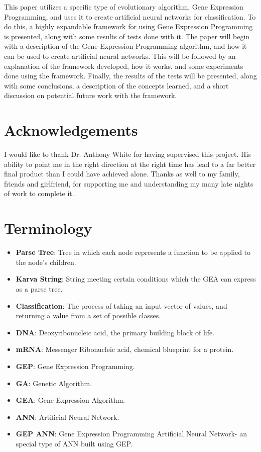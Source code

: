 \documentclass[a4paper,11pt]{report}
\begin{document}
This paper utilizes a specific type of evolutionary algorithm, Gene Expression Programming,
and uses it to create artificial neural networks for classification. To do this, a highly expandable 
framework for using Gene Expression Programming is presented, along with some results of tests done 
with it. The paper will begin with a description of the Gene Expression Programming algorithm, and 
how it can be used to create artificial neural networks. This will be followed by an explanation 
of the framework developed, how it works, and some experiments done using the framework. Finally,
the results of the tests will be presented, along with some conclusions, a description of the 
concepts learned, and a short discussion on potential future work with the framework. 

\chapter*{Acknowledgements}
I would like to thank Dr. Anthony White for having supervised this project. His ability 
to point me in the right direction at the right time has lead to a far better final product than I 
could have achieved alone. Thanks as well to my family, friends and girlfriend, for supporting me and 
understanding my many late nights of work to complete it. 

\tableofcontents 
{}

\chapter{Terminology}
\begin{itemize}
\item \textbf{Parse Tree}: Tree in which each node represents a function to be applied to the node's children.
\item \textbf{Karva String}: String meeting certain conditions which the GEA can express as a parse tree.
\item \textbf{Classification}: The process of taking an input vector of values, and returning a value from a 
      set of possible classes.
\item \textbf{DNA}: Deoxyribonucleic acid, the primary building block of life.
\item \textbf{mRNA}: Messenger Ribonucleic acid, chemical blueprint for a protein. 
 \item \textbf{GEP}: Gene Expression Programming.
\item \textbf{GA}: Genetic Algorithm.
\item \textbf{GEA}: Gene Expression Algorithm.
\item \textbf{ANN}: Artificial Neural Network.
\item \textbf{GEP ANN}: Gene Expression Programming Artificial Neural Network- an special type of ANN built 
using GEP. 
\end{itemize}
\end{document}
